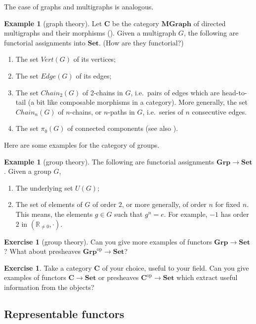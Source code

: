 \documentclass[12pt,oneside]{scrbook}
\numberwithin{equation}{section}
\theoremstyle{plain}
\theoremstyle{definition}
\newtheorem{eg}[thm]{Example}
\newtheorem{ex}[thm]{Exercise}
\newcommand{\R}{\mathbb{R}}
\newcommand{\cat}[1]{{\mathbf{#1}}} %
\newcommand{\op}{\mathrm{op}} %
\newcommand{\Set}{\cat{Set}}
\newcommand{\Grp}{\cat{Grp}}
\DeclareMathOperator{\1}{\mathbbm{1}}
\DeclareMathOperator{\2}{\mathbbm{2}}
\begin{document}
The case of graphs and multigraphs is analogous.
\begin{eg}[graph theory]\label{graphtoset}
 Let $\cat{C}$ be the category $\cat{MGraph}$ of directed multigraphs and their morphisms (). Given a multigraph $G$, the following are functorial assignments into $\Set$. (How are they functorial?)
 \begin{enumerate}
  \item The set $\mathit{Vert}(G)$ of its vertices;
  \item The set $\mathit{Edge}(G)$ of its edges;
  \item The set $\mathit{Chain}_2(G)$ of 2-chains in $G$, i.e.~pairs of edges which are head-to-tail (a bit like composable morphisms in a category). More generally, the set $\mathit{Chain}_n(G)$ of $n$-chains, or $n$-paths in $G$, i.e.~series of $n$ consecutive edges.
  \item The set $\pi_0(G)$ of connected components (see also ).
 \end{enumerate}
\end{eg}

Here are some examples for the category of groups.
\begin{eg}[group theory]\label{grptoset}
 The following are functorial assignments $\Grp\to\Set$. Given a group $G$,
 \begin{enumerate}
  \item The underlying set $U(G)$;
  \item The set of elements of $G$ of order $2$, or more generally, of order $n$ for fixed $n$. This means, the elements $g\in G$ such that $g^n=e$. For example, $-1$ has order $2$ in $(\R_{\ne 0},\cdot)$.
 \end{enumerate}
\end{eg}

\begin{ex}[group theory]
 Can you give more examples of functors $\Grp\to\Set$? What about presheaves $\Grp^\op\to\Set$?
\end{ex}

\begin{ex}\label{yourcatset}
 Take a category $\cat{C}$ of your choice, useful to your field. Can you give examples of functors $\cat{C}\to\Set$ or presheaves $\cat{C}^\op\to\Set$ which extract useful information from the objects?
\end{ex}

\subsection{Representable functors}
\end{document}
